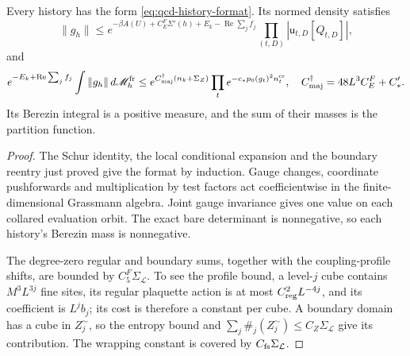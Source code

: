 \documentclass[11pt,letterpaper,reqno]{amsart}
\makeatletter
\theoremstyle{definition}
\newcommand{\ms@majorstart}{%
  \pushQED{\qed}\renewcommand{\qedsymbol}{$\blacksquare\square$}}
\newenvironment{theorem}[1][]{\ms@majorstart\ms@theorem[#1]}
  {\popQED\endms@theorem}
\theoremstyle{remark}
\makeatother
\begin{document}
\begin{theorem}[The upper history bound]\label{C-399-3}
Every history has the form \eqref{eq:qcd-history-format}.
Its normed density satisfies
\[
 \|g_h\|\le
 e^{-\beta A(U)+C_E^F\Sigma'(h)+E_k-\operatorname{Re}\sum_jf_j}
 \prod_{(t,D)}|\mathsf u_{t,D}[Q_{t,D}]|,
\]
and
\[
 e^{-E_k+\operatorname{Re}\sum_jf_j}\int\|g_h\|\,d\mathscr M_h^{\rm fr}
 \le e^{C_{\rm maj}^\dagger(n_k+\Sigma_Z)}
 \prod_t e^{-c_*p_0(g_t)^2n_t^{\rm cr}},
 \quad C_{\rm maj}^\dagger=48L^3C_E^F+C_*'.
\]
Its Berezin integral is a positive measure, and the sum of
their masses is the partition function.
\end{theorem}
\begin{proof}
The Schur identity, the local conditional expansion and the
boundary reentry just proved give the format by induction.
Gauge changes, coordinate pushforwards and multiplication by
test factors act coefficientwise in the finite-dimensional
Grassmann algebra. Joint gauge invariance gives one value on
each collared evaluation orbit. The exact bare determinant
is nonnegative, so each history's Berezin mass is nonnegative.

The degree-zero regular and boundary sums, together with the
coupling-profile shifts, are bounded by
$C_5^F\Sigma_{\mathcal L}$. To see the profile bound, a
level-$j$ cube contains $M^3L^{3j}$ fine sites, its regular
plaquette action is at most $C_{\rm reg}^2L^{-4j}$, and its
coefficient is $L^jb_j$; its cost is therefore a constant
per cube. A boundary domain has a cube in $Z_j^\sim$, so the
entropy bound and
$\sum_j\#_j(Z_j^\sim)\le C_Z\Sigma_{\mathcal L}$ give its
contribution. The wrapping constant is covered by
$C_{\rm fs}\Sigma_{\mathcal L}$.


\end{proof}
\end{document}
